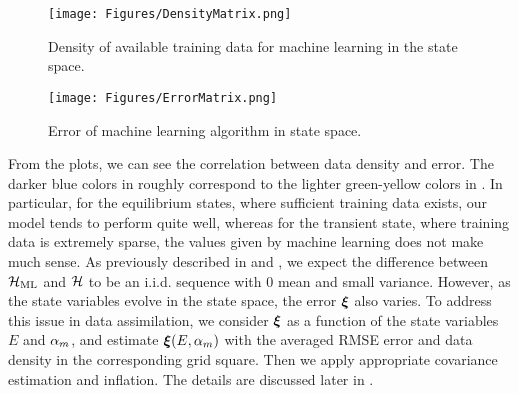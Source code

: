 \begin{figure}\label{fig:densitymatrix}
\begin{center}
\texttt{[image: Figures/DensityMatrix.png]} 
\end{center}
\caption{Density of available training data for machine learning in the state space.}
\end{figure}

\begin{figure}\label{fig:errormatrix}
\begin{center}
\texttt{[image: Figures/ErrorMatrix.png]} 
\end{center}
\caption{Error of machine learning algorithm in state space.}
\end{figure}

\par From the plots, we can see the correlation between data density and error. The darker blue colors in  roughly correspond to the lighter green-yellow colors in . In particular, for the equilibrium states, where sufficient training data exists, our model tends to perform quite well, whereas for the transient state, where training data is extremely sparse, the values given by machine learning does not make much sense. As previously described in  and , we expect the difference between $\mathcal{H}_{\text{ML}}$ and $\mathcal{H}$ to be an i.i.d. sequence with 0 mean and small variance. However, as the state variables evolve in the state space, the error $\bm{\xi}$ also varies. To address this issue in data assimilation, we consider $\bm{\xi}$ as a function of the state variables $E$ and $\alpha_m$, and estimate $\bm{\xi}(E,\alpha_m)$ with the averaged RMSE error and data density in the corresponding grid square. Then we apply appropriate covariance estimation and inflation. The details are discussed later in .

